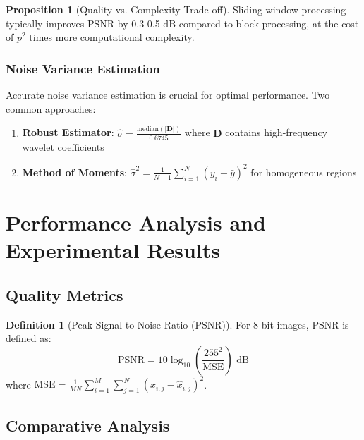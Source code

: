 \documentclass[12pt]{article}
\theoremstyle{definition}
\newtheorem{proposition}[theorem]{Proposition}
\newtheorem{definition}[theorem]{Definition}
\begin{document}
\begin{proposition}[Quality vs. Complexity Trade-off]
    \label{prop:quality_complexity}
    Sliding window processing typically improves PSNR by 0.3-0.5 dB compared to block processing, at the cost of $p^2$ times more computational complexity.
\end{proposition}

\subsubsection{Noise Variance Estimation}
\label{subsubsec:noise_estimation}

Accurate noise variance estimation is crucial for optimal performance. Two common approaches:

\begin{enumerate}[leftmargin=*]
    \item \textbf{Robust Estimator}: $\hat{\sigma} = \frac{\text{median}(|\mathbf{D}|)}{0.6745}$ where $\mathbf{D}$ contains high-frequency wavelet coefficients
    \item \textbf{Method of Moments}: $\hat{\sigma}^2 = \frac{1}{N-1}\sum_{i=1}^N (y_i - \bar{y})^2$ for homogeneous regions
\end{enumerate}

\newpage


\section{Performance Analysis and Experimental Results}
\label{sec:performance}

\subsection{Quality Metrics}
\label{subsec:quality_metrics}

\begin{definition}[Peak Signal-to-Noise Ratio (PSNR)]
    \label{def:psnr}
    For 8-bit images, PSNR is defined as:
    \begin{equation}
        \text{PSNR} = 10 \log_{10}\left(\frac{255^2}{\text{MSE}}\right) \text{ dB}
    \end{equation}
    where $\text{MSE} = \frac{1}{MN}\sum_{i=1}^M\sum_{j=1}^N (x_{i,j} - \hat{x}_{i,j})^2$.
\end{definition}

\subsection{Comparative Analysis}
\label{subsec:comparative_analysis}
\end{document}
